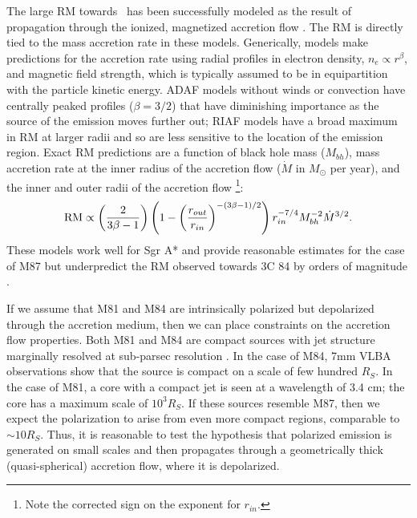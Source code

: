 \documentclass[12pt,preprint]{aastex}
\begin{document}
The large RM towards \sgra\ has been successfully modeled as the result of propagation through the
ionized, magnetized accretion flow \citep{2003ApJ...588..331B,2007ApJ...654L..57M}.  The RM is directly tied to the mass accretion
rate in these models.  Generically, models make predictions for the accretion rate using
radial profiles
in electron density, $n_e \propto r^{\beta}$, and magnetic field strength, which
is typically assumed to be  in equipartition with the particle kinetic energy.
ADAF models without winds or convection
have centrally peaked profiles ($\beta=3/2$) that have diminishing importance as
the source of the emission moves further out; RIAF models \citep[$\beta\approx 1/2$;][]{1999MNRAS.303L...1B} have a broad maximum in RM at larger radii and so are
less sensitive to the location of the emission region.  Exact RM predictions are
a function of black hole mass ($M_{bh}$), mass accretion rate at the inner
radius of the accretion flow ($\dot{M}$ in $M_\odot$ per year), and the inner
and outer radii of the accretion flow 
\citep[$r_{in}$, $r_{out}$ expressed in $R_s$;][]{2006JPhCS..54..354M}\footnote{Note the corrected sign on the exponent
for $r_{in}$.}:
\begin{equation}
{\rm RM} \propto \left( {2 \over 3\beta -1 } \right) \left( 1 - \left({r_{out} \over r_{in} }\right)^{-(3\beta-1)/2} \right)   r_{in}^{-7/4} M_{bh}^{-2} \dot{M}^{3/2}.
\label{eq:rm}
\end{equation}
These models work well for Sgr A*  and provide reasonable estimates for
the case of M87 \citep{2014ApJ...783L..33K} but underpredict the RM
observed towards 3C 84 by orders of magnitude \citep{2014ApJ...797...66P}.

If we assume that M81 and M84 are intrinsically polarized but depolarized through
the accretion medium, then we can place constraints on the accretion flow properties.
Both M81 and M84 are compact sources with jet structure marginally resolved 
at sub-parsec resolution
\citep{2000ApJ...532..895B,2004AJ....127..119L,2008ApJ...681..905M}.  In the case of
M84, 7mm VLBA observations show that the source is compact on a scale of few hundred $R_S$.
In the case of M81, a core with a compact jet is seen at a wavelength of 3.4 cm; the core has
a maximum scale of $10^3 R_S$.  If these sources resemble M87,
then we expect the polarization to arise from even more compact regions, comparable
to $\sim 10 R_S$.  Thus, it is reasonable to test the hypothesis that 
polarized emission is generated on small scales and then propagates
through a geometrically thick (quasi-spherical) accretion flow, where it is depolarized.
\end{document}
